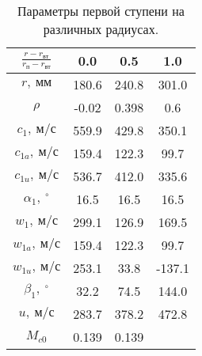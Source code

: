 \documentclass[a4paper,10pt]{article}
\begin{document}
    
    \begin{longtable}{
    |
%    
    c|
%    
    c|
%    
    c|
%    
    c|
%    
    }
        \caption{Параметры первой ступени на различных радиусах.}\\
        \hline

%        
        $\frac{r - r_{вт}}{r_{п} - r_{вт}}$
%        
        & 0.0
%        
        & 0.5
%        
        & 1.0
%        
        \\
        \hline
%        
        $r,\ мм$
%        
        & 180.6
%        
        & 240.8
%        
        & 301.0
%        
        \\
        \hline
%        
        $\rho$
%        
        & -0.02
%        
        & 0.398
%        
        & 0.6
%        
        \\
        \hline
%        
        $c_1,\ м/с$
%        
        & 559.9
%        
        & 429.8
%        
        & 350.1
%        
        \\
        \hline
%        
        $c_{1a},\ м/с$
%        
        & 159.4
%        
        & 122.3
%        
        & 99.7
%        
        \\
        \hline
%        
        $c_{1u},\ м/с$
%        
        & 536.7
%        
        & 412.0
%        
        & 335.6
%        
        \\
        \hline
%        
        $\alpha_1,\ ^\circ$
%        
        & 16.5
%        
        & 16.5
%        
        & 16.5
%        
        \\
        \hline
%        
        $w_1,\ м/с$
%        
        & 299.1
%        
        & 126.9
%        
        & 169.5
%        
        \\
        \hline
%        
        $w_{1a},\ м/с$
%        
        & 159.4
%        
        & 122.3
%        
        & 99.7
%        
        \\
        \hline
%        
        $w_{1u},\ м/с$
%        
        & 253.1
%        
        & 33.8
%        
        & -137.1
%        
        \\
        \hline
%        
        $\beta_1,\ ^\circ$
%        
        & 32.2
%        
        & 74.5
%        
        & 144.0
%        
        \\
        \hline
%        
        $u,\ м/с$
%        
        & 283.7
%        
        & 378.2
%        
        & 472.8
%        
        \\
        \hline
%        
        $M_{c0}$
%        
        & 0.139
%        
        & 0.139

\end{longtable}
\end{document}
